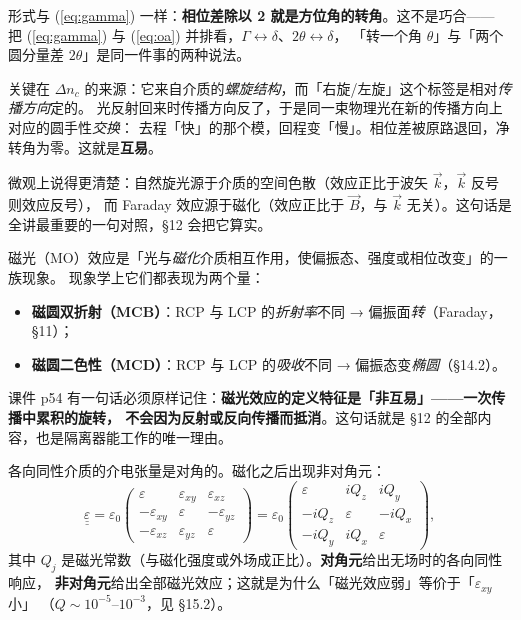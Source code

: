 \documentclass[11pt]{ctexart}
\let\subhdrtheme\subhdr
\renewcommand{\subhdr}[1]{\needspace{3\baselineskip}\subhdrtheme{#1}}
\let\hdrorig\hdr
\renewcommand{\hdr}[2]{\needspace{8\baselineskip}\hdrorig{#1}{#2}}
\begin{document}
形式与 (\ref{eq:gamma}) 一样：\textbf{相位差除以 2 就是方位角的转角}。这不是巧合——
把 (\ref{eq:gamma}) 与 (\ref{eq:oa}) 并排看，$\Gamma\leftrightarrow\delta$、$2\theta\leftrightarrow\delta$，
「转一个角 $\theta$」与「两个圆分量差 $2\theta$」是同一件事的两种说法。


关键在 $\Delta n_c$ 的来源：它来自介质的\emph{螺旋结构}，而「右旋/左旋」这个标签是相对\emph{传播方向}定的。
光反射回来时传播方向反了，于是同一束物理光在新的传播方向上对应的圆手性\emph{交换}：
去程「快」的那个模，回程变「慢」。相位差被原路退回，净转角为零。这就是\textbf{互易}。

微观上说得更清楚：自然旋光源于介质的空间色散（效应正比于波矢 $\vec k$，$\vec k$ 反号则效应反号），
而 Faraday 效应源于磁化（效应正比于 $\vec B$，与 $\vec k$ 无关）。这句话是全讲最重要的一句对照，§12 会把它算实。



磁光（MO）效应是「光与\emph{磁化}介质相互作用，使偏振态、强度或相位改变」的一族现象。
现象学上它们都表现为两个量：

\begin{itemize}
\item \textbf{磁圆双折射（MCB）}：RCP 与 LCP 的\emph{折射率}不同 → 偏振面\emph{转}（Faraday，§11）；
\item \textbf{磁圆二色性（MCD）}：RCP 与 LCP 的\emph{吸收}不同 → 偏振态变\emph{椭圆}（§14.2）。
\end{itemize}

课件 p54 有一句话必须原样记住：\textbf{磁光效应的定义特征是「非互易」——一次传播中累积的旋转，
不会因为反射或反向传播而抵消}。这句话就是 §12 的全部内容，也是隔离器能工作的唯一理由。


各向同性介质的介电张量是对角的。磁化之后出现非对角元：
\begin{equation}
\underline{\underline{\varepsilon}}=\varepsilon_0
\begin{pmatrix}
\varepsilon & \varepsilon_{xy} & \varepsilon_{xz}\\
-\varepsilon_{xy} & \varepsilon & -\varepsilon_{yz}\\
-\varepsilon_{xz} & \varepsilon_{yz} & \varepsilon
\end{pmatrix}
=\varepsilon_0
\begin{pmatrix}
\varepsilon & iQ_z & iQ_y\\
-iQ_z & \varepsilon & -iQ_x\\
-iQ_y & iQ_x & \varepsilon
\end{pmatrix},
\end{equation}
其中 $Q_j$ 是磁光常数（与磁化强度或外场成正比）。\textbf{对角元}给出无场时的各向同性响应，
\textbf{非对角元}给出全部磁光效应；这就是为什么「磁光效应弱」等价于「$\varepsilon_{xy}$ 小」
（$Q\sim10^{-5}$--$10^{-3}$，见 §15.2）。
\end{document}
